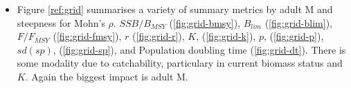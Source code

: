 \begin{itemize}
  \item Figure \ref{ref:grid} summarises a variety of summary metrics by adult M and steepness for Mohn's $\rho$. $SSB/B_{MSY}$ (\ref{fig:grid-bmsy}), $B_{lim}$ (\ref{fig:grid-blim}), $F/F_{MSY}$ (\ref{fig:grid-fmsy}), $r$ (\ref{fig:grid-r}), $K$, (\ref{fig:grid-k}), $p$, (\ref{fig:grid-p}), $sd(sp)$, (\ref{fig:grid-sp}), and Population doubling time (\ref{fig:grid-dt}). There is some modality due to catchability, particulary in current biomass status and $K$.  Again the biggest impact is adult M. 

\end{itemize}


